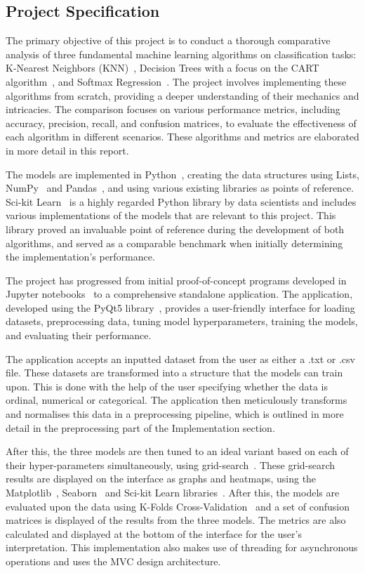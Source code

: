 \documentclass[letterpaper,10pt]{article}
\begin{document}
\newpage
\subsection{Project Specification}
The primary objective of this project is to conduct a thorough comparative analysis of three fundamental machine learning algorithms on classification tasks: K-Nearest Neighbors (KNN)~\cite{NNEFixHodges,NNCoverHart}, Decision Trees with a focus on the CART algorithm~\cite{CARTBreiman}, and Softmax Regression~\cite[pp 209-210]{bishopml_softmax}. The project involves implementing these algorithms from scratch, providing a deeper understanding of their mechanics and intricacies. The comparison focuses on various performance metrics, including accuracy, precision, recall, and confusion matrices, to evaluate the effectiveness of each algorithm in different scenarios. These algorithms and metrics are elaborated in more detail in this report. \par
The models are implemented in Python~\cite{python3}, creating the data structures using Lists, NumPy~\cite{numpy} and Pandas~\cite{pandas}, and using various existing libraries as points of reference. Sci-kit Learn~\cite{scikit-learn} is a highly regarded Python library by data scientists and includes various implementations of the models that are relevant to this project. This library proved an invaluable point of reference during the development of both algorithms, and served as a comparable benchmark when initially determining the implementation's performance. \par
The project has progressed from initial proof-of-concept programs developed in Jupyter notebooks~\cite{jupyter} to a comprehensive standalone application. The application, developed using the PyQt5 library~\cite{pyqt5}, provides a user-friendly interface for loading datasets, preprocessing data, tuning model hyperparameters, training the models, and evaluating their performance. \par
The application accepts an inputted dataset from the user as either a .txt or .csv file. These datasets are transformed into a structure that the models can train upon. This is done with the help of the user specifying whether the data is ordinal, numerical or categorical. The application then meticulously transforms and normalises this data in a preprocessing pipeline, which is outlined in more detail in the preprocessing part of the Implementation section.\par
After this, the three models are then tuned to an ideal variant based on each of their hyper-parameters simultaneously, using grid-search~\cite{grid_search}. These grid-search results are displayed on the interface as graphs and heatmaps, using the Matplotlib~\cite{matplotlib}, Seaborn~\cite{seaborn} and Sci-kit Learn libraries~\cite{scikit-learn}. After this, the models are evaluated upon the data using K-Folds Cross-Validation~\cite{cross-valkohavi} and a set of confusion matrices is displayed of the results from the three models. The metrics are also calculated and displayed at the bottom of the interface for the user's interpretation.  This implementation also makes use of threading for asynchronous operations and uses the MVC design architecture.\par
\end{document}
